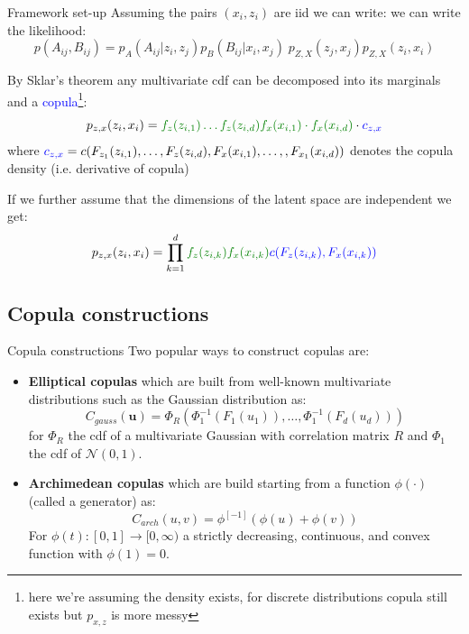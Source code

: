\documentclass[10.5pt]{beamer}
\begin{document}
\begin{frame}{Framework set-up}
Assuming the pairs $(x_i, z_i)$ are iid we can write: we can write the likelihood:
\vspace{-.5em}
\[
p(A_{ij}, B_{ij}) = p_A(A_{ij}|z_{i}, z_{j}) p_B(B_{ij}|x_{i}, x_{j}) \;p_{Z, X}(z_{j},x_{j})p_{Z, X}(z_{i}, x_{i})
\]
\vspace{-1.25em}

By Sklar’s theorem \citep{sklar_fonctions_1959} any multivariate cdf can be decomposed into its \textcolor{green!50!black}{marginals} and a \textcolor{blue}{copula}\footnote{here we're assuming the density exists, for discrete distributions copula still exists but $p_{x,z}$ is more messy}:
\[
p_{z, x}(z_{i}, x_{i}) = {\color{green!50!black}f_z(z_{i, 1}) \dots f_z(z_{i, d}) f_x(x_{i, 1}) \cdot f_x(x_{i, d})} \cdot {\color{blue}c_{z, x}}
\]
where ${\color{blue}c_{z, x}}= c(F_{z_{1}}(z_{i, 1}), \dots, F_z(z_{i,d}), F_x(x_{i,1}), \dots,,F_{x_{1}}(x_{i, d}) )$ denotes the copula density (i.e. derivative of copula)
\vspace{.5em}
\pause

If we further assume that the dimensions of the latent space are independent we get:
\vspace{-.5em}
\[
p_{z, x}(z_{i}, x_{i}) = \prod_{k=1}^d {\color{green!50!black}f_z(z_{i, k})f_x(x_{i, k})}{\color{blue}c(F_z(z_{i, k}), F_x(x_{i, k}))}
\]

\end{frame}


\subsection{Copula constructions}
\begin{frame}{Copula constructions}
Two popular ways to construct copulas are:
\begin{itemize}
    \item \textbf{Elliptical copulas} which are built from well-known multivariate distributions such as the Gaussian distribution as:
    \[
    C_{gauss}(\mathbf{u}) = \Phi_{R}(\Phi_{1}^{-1}(F_{1}(u_1)),\dots, \Phi_{1}^{-1}(F_{d}(u_d)))
    \]
    for $\Phi_R$ the cdf of a multivariate Gaussian with correlation matrix $R$ and $\Phi_1$ the cdf of $\mathcal{N}(0, 1)$.
    \item \textbf{Archimedean copulas} which are build starting from a function $\phi(\cdot)$ (called a generator) as:
    \[
    C_{arch}(u, v) = \phi^{[-1]}(\phi(u)+\phi(v))
    \]
    For $\phi(t): [0,1]\to[0, \infty)$ a strictly decreasing, continuous, and convex function with $\phi(1)=0$.
\end{itemize}


\vspace{.5em}

\end{frame}
\end{document}
